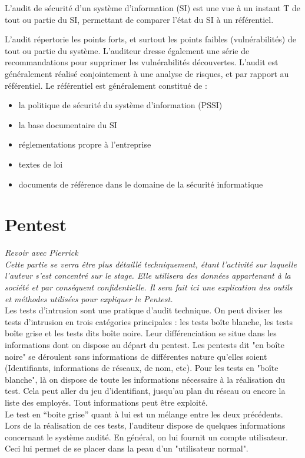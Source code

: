 \documentclass[a4paper]{memoir}
\begin{document}
L'audit de sécurité d'un système d'information (SI) est une vue à un instant T de tout ou partie du SI, permettant de comparer l'état du SI à un référentiel.

L'audit répertorie les points forts, et surtout les points faibles (vulnérabilités) de tout ou partie du système. L'auditeur dresse également une série de recommandations pour supprimer les vulnérabilités découvertes. L'audit est généralement réalisé conjointement à une analyse de risques, et par rapport au référentiel. Le référentiel est généralement constitué de :

\begin{itemize}
    \item la politique de sécurité du système d'information (PSSI)
    \item la base documentaire du SI
    \item réglementations propre à l'entreprise
    \item textes de loi
    \item documents de référence dans le domaine de la sécurité informatique
\end{itemize}

\section{Pentest}

\textit{Revoir avec Pierrick\\
  Cette partie se verra être plus détaillé techniquement, étant l'activité sur laquelle l'auteur s'est concentré sur le stage. Elle utilisera des données appartenant à la société et par conséquent confidentielle. Il sera fait ici une explication des outils et méthodes utilisées pour expliquer le Pentest.}\\

Les tests d'intrusion sont une pratique d'audit technique. On peut diviser les tests d'intrusion en trois catégories principales : les tests boîte blanche, les tests boîte grise et les tests dits boîte noire. Leur différenciation se situe dans les informations dont on dispose au départ du pentest. Les pentests dit "en boîte noire" se déroulent sans informations de différentes nature qu'elles soient (Identifiants, informations de réseaux, de nom, etc). Pour les tests en "boîte blanche", là on dispose de toute les informations nécessaire à la réalisation du test. Cela peut aller du jeu d'identifiant, jusqu'au plan du réseau ou encore la liste des employés. Tout informations peut être exploité.\\
\noindent Le test en ``boite grise'' quant à lui est un mélange entre les deux précédents. Lors de la réalisation de ces tests, l'auditeur dispose de quelques informations concernant le système audité. En général, on lui fournit un compte utilisateur. Ceci lui permet de se placer dans la peau d'un "utilisateur normal". 
\end{document}
